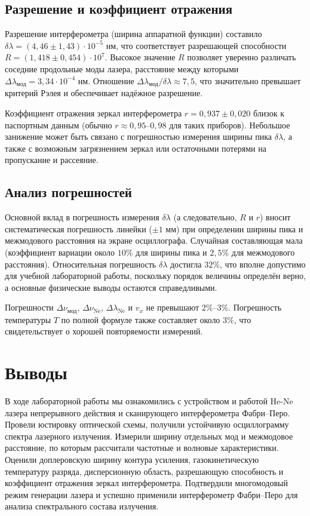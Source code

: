 \documentclass[a4paper]{article}
\begin{document}
\subsection{Разрешение и коэффициент отражения}
Разрешение интерферометра (ширина аппаратной функции) составило $\delta\lambda = (4,46 \pm 1,43)\cdot10^{-5}$ нм, что соответствует разрешающей способности $R = (1,418 \pm 0,454)\cdot10^7$. Высокое значение $R$ позволяет уверенно различать соседние продольные моды лазера, расстояние между которыми $\Delta\lambda_{\text{мод}} = 3,34\cdot10^{-4}$ нм. Отношение $\Delta\lambda_{\text{мод}} / \delta\lambda \approx 7,5$, что значительно превышает критерий Рэлея и обеспечивает надёжное разрешение.

Коэффициент отражения зеркал интерферометра $r = 0,937 \pm 0,020$ близок к паспортным данным (обычно $r \approx 0,95$–$0,98$ для таких приборов). Небольшое занижение может быть связано с погрешностью измерения ширины пика $\delta\lambda$, а также с возможным загрязнением зеркал или остаточными потерями на пропускание и рассеяние.

\subsection{Анализ погрешностей}
Основной вклад в погрешность измерения $\delta\lambda$ (а следовательно, $R$ и $r$) вносит систематическая погрешность линейки ($\pm1$ мм) при определении ширины пика и межмодового расстояния на экране осциллографа. Случайная составляющая мала (коэффициент вариации около $10\%$ для ширины пика и $2,5\%$ для межмодового расстояния). Относительная погрешность $\delta\lambda$ достигла $32\%$, что вполне допустимо для учебной лабораторной работы, поскольку порядок величины определён верно, а основные физические выводы остаются справедливыми.

Погрешности $\Delta\nu_{\text{мод}}$, $\Delta\nu_{\text{Ne}}$, $\Delta\lambda_{\text{Ne}}$ и $v_x$ не превышают $2\%$–$3\%$. Погрешность температуры $T$ по полной формуле также составляет около $3\%$, что свидетельствует о хорошей повторяемости измерений.

\section{Выводы}
В ходе лабораторной работы мы ознакомились с устройством и работой He-Ne лазера непрерывного действия и сканирующего интерферометра Фабри–Перо. Провели юстировку оптической схемы, получили устойчивую осциллограмму спектра лазерного излучения. Измерили ширину отдельных мод и межмодовое расстояние, по которым рассчитали частотные и волновые характеристики. Оценили доплеровскую ширину контура усиления, газокинетическую температуру разряда, дисперсионную область, разрешающую способность и коэффициент отражения зеркал интерферометра. Подтвердили многомодовый режим генерации лазера и успешно применили интерферометр Фабри–Перо для анализа спектрального состава излучения.
\end{document}
